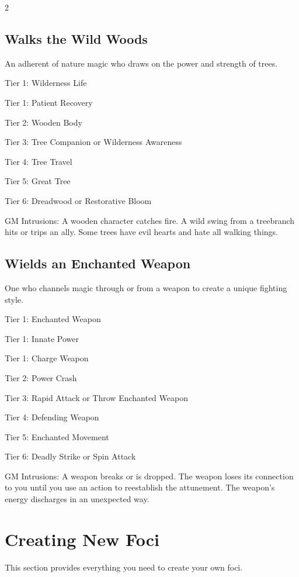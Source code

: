 \begin{multicols}{2}
\subsection{Walks the Wild Woods}

An adherent of nature magic who draws on the power and strength of trees. 

Tier 1: Wilderness Life 

Tier 1: Patient Recovery

Tier 2: Wooden Body

Tier 3: Tree Companion or Wilderness Awareness 

Tier 4: Tree Travel

Tier 5: Great Tree

Tier 6: Dreadwood or Restorative Bloom

GM Intrusions: A wooden character catches fire. A wild swing from a treebranch hits or trips an ally. Some trees have evil hearts and hate all walking things.

\subsection{Wields an Enchanted Weapon}

One who channels magic through or from a weapon to create a unique fighting style.

Tier 1: Enchanted Weapon

Tier 1: Innate Power

Tier 1: Charge Weapon

Tier 2: Power Crash

Tier 3: Rapid Attack or Throw Enchanted Weapon

Tier 4: Defending Weapon

Tier 5: Enchanted Movement

Tier 6: Deadly Strike or Spin Attack 

GM Intrusions: A weapon breaks or is dropped. The weapon loses its connection to you until you use an action to reestablish the attunement. The weapon’s energy discharges in an unexpected way.

\section{Creating New Foci}

This section provides everything you need to create your own foci.


\end{multicols}
